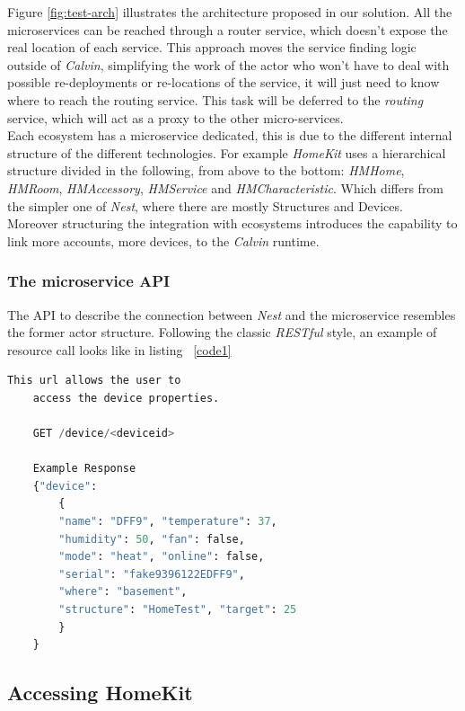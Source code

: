 Figure \ref{fig:test-arch} illustrates the architecture proposed in our solution.
All the microservices can be reached through a router service, which doesn't expose
the real location of each service. This approach moves the service finding logic outside
of \textit{Calvin}, simplifying the work of the actor who won't have to deal with possible
re-deployments or re-locations of the service, it will just need to know where to reach the
routing service. This task will be deferred to the \textit{routing} service, which will act
as a proxy to the other micro-services.\\
Each ecosystem has a microservice dedicated, this is due to the different internal structure of the
different technologies. For example \textit{HomeKit} uses a hierarchical structure divided in the following,
from above to the bottom: \textit{HMHome}, \textit{HMRoom}, \textit{HMAccessory}, \textit{HMService} and \textit{HMCharacteristic}.
Which differs from the simpler one of \textit{Nest}, where there are mostly Structures and Devices.\\
Moreover structuring the integration with ecosystems introduces the capability to link more accounts, more devices,
to the \textit{Calvin} runtime.

\subsubsection{The microservice API}

The API to describe the connection between \textit{Nest} and the microservice
resembles the former actor structure.
Following the classic \textit{RESTful} style, an example of resource call
looks like in listing ~\ref{code1}

\begin{lstlisting}[language=Python,frame=single,caption=Example resource response,label=code1]
    This url allows the user to
    access the device properties.

    GET /device/<deviceid>

    Example Response
    {"device":
        {
        "name": "DFF9", "temperature": 37,
        "humidity": 50, "fan": false,
        "mode": "heat", "online": false,
        "serial": "fake9396122EDFF9",
        "where": "basement",
        "structure": "HomeTest", "target": 25
        }
    }
\end{lstlisting}




\pagebreak
\subsection{Accessing HomeKit}

